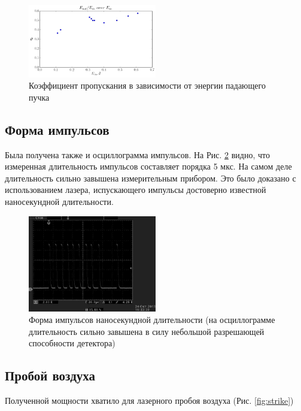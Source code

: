 \documentclass[twocolumn]{article}
\begin{document}
 
    \begin{figure}
    \includegraphics[width=0.5\textwidth]{LEMPH Report_files/nrj_graph.png}
    \caption{Коэффициент пропускания в зависимости от энергии падающего пучка \label{fig:nrj_pogl}}
    \end{figure}
    

    
\subsection{Форма импульсов}

    
 Была получена также и осциллограмма импульсов. На Рис. \ref{fig:mq_osc} видно, что измеренная длительность импульсов составляет порядка 5 мкс. На самом деле длительность сильно завышена измерительным прибором. Это было доказано с использованием лазера, испускающего импульсы достоверно известной наносекундной длительности.
 \begin{figure}
    \includegraphics[width=0.5\textwidth]{LEMPH Report_files/LEMPH Report_37_0.jpeg}
    \caption{Форма импульсов наносекундной длительности (на осциллограмме длительность сильно завышена в силу небольшой разрешающей способности детектора) \label{fig:mq_osc}}
    \end{figure}
    
          \newpage  
        
    
\subsection{Пробой воздуха}Полученной мощности хватило для лазерного пробоя воздуха (Рис. \ref{fig:strike})
\end{document}
